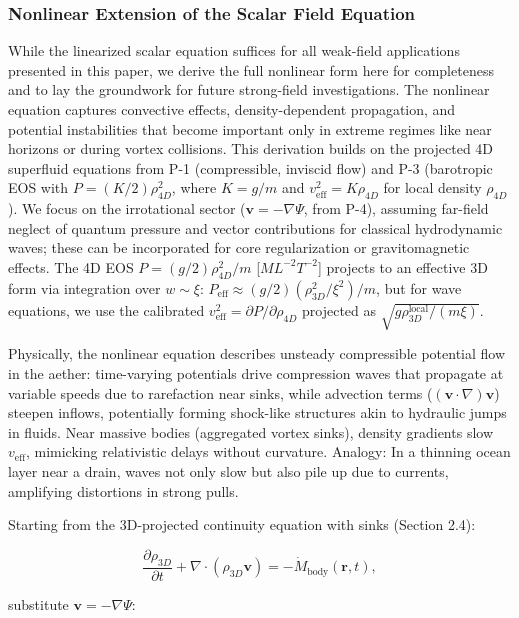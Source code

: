 \documentclass{article}
\begin{document}
\subsubsection{Nonlinear Extension of the Scalar Field Equation}

While the linearized scalar equation suffices for all weak-field applications presented in this paper, we derive the full nonlinear form here for completeness and to lay the groundwork for future strong-field investigations. The nonlinear equation captures convective effects, density-dependent propagation, and potential instabilities that become important only in extreme regimes like near horizons or during vortex collisions. This derivation builds on the projected 4D superfluid equations from P-1 (compressible, inviscid flow) and P-3 (barotropic EOS with $P = (K/2) \rho_{4D}^2$, where $K = g/m$ and $v_{\text{eff}}^2 = K \rho_{4D}$ for local density $\rho_{4D}$). We focus on the irrotational sector ($\mathbf{v} = -\nabla \Psi$, from P-4), assuming far-field neglect of quantum pressure and vector contributions for classical hydrodynamic waves; these can be incorporated for core regularization or gravitomagnetic effects. The 4D EOS $P = (g/2) \rho_{4D}^2 / m$ [$M L^{-2} T^{-2}$] projects to an effective 3D form via integration over $w \sim \xi$: $P_{\text{eff}} \approx (g/2) (\rho_{3D}^2 / \xi^2) / m$, but for wave equations, we use the calibrated $v_{\text{eff}}^2 = \partial P / \partial \rho_{4D}$ projected as $\sqrt{g \rho_{3D}^{\text{local}} / (m \xi)}$.

Physically, the nonlinear equation describes unsteady compressible potential flow in the aether: time-varying potentials drive compression waves that propagate at variable speeds due to rarefaction near sinks, while advection terms ($( \mathbf{v} \cdot \nabla ) \mathbf{v}$) steepen inflows, potentially forming shock-like structures akin to hydraulic jumps in fluids. Near massive bodies (aggregated vortex sinks), density gradients slow $v_{\text{eff}}$, mimicking relativistic delays without curvature. Analogy: In a thinning ocean layer near a drain, waves not only slow but also pile up due to currents, amplifying distortions in strong pulls.

Starting from the 3D-projected continuity equation with sinks (Section 2.4):

\[
\frac{\partial \rho_{3D}}{\partial t} + \nabla \cdot (\rho_{3D} \mathbf{v}) = -\dot{M}_{\text{body}}(\mathbf{r}, t),
\]

substitute $\mathbf{v} = -\nabla \Psi$:
\end{document}
